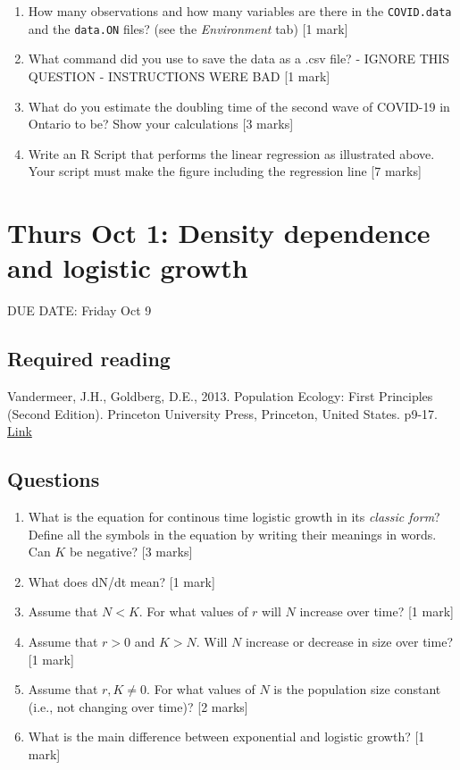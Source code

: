 \documentclass[]{book}
\begin{document}
\begin{enumerate}
\def\labelenumi{\arabic{enumi}.}
\item
  How many observations and how many variables are there in the
  \texttt{COVID.data} and the \texttt{data.ON} files? (see the
  \emph{Environment} tab) {[}1 mark{]}
\item
  What command did you use to save the data as a .csv file? - IGNORE
  THIS QUESTION - INSTRUCTIONS WERE BAD {[}1 mark{]}
\item
  What do you estimate the doubling time of the second wave of COVID-19
  in Ontario to be? Show your calculations {[}3 marks{]}
\item
  Write an R Script that performs the linear regression as illustrated
  above. Your script must make the figure including the regression line
  {[}7 marks{]}
\end{enumerate}

\chapter{Thurs Oct 1: Density dependence and logistic
growth}\label{thurs-oct-1-density-dependence-and-logistic-growth}

DUE DATE: Friday Oct 9

\section{Required reading}\label{required-reading}

Vandermeer, J.H., Goldberg, D.E., 2013. Population Ecology: First
Principles (Second Edition). Princeton University Press, Princeton,
United States. p9-17.
\href{https://ebookcentral-proquest-com.qe2a-proxy.mun.ca/lib/mun/detail.action?docID=1205619}{Link}

\section{Questions}\label{questions}

\begin{enumerate}
\def\labelenumi{\arabic{enumi}.}
\item
  What is the equation for continous time logistic growth in its
  \emph{classic form}? Define all the symbols in the equation by writing
  their meanings in words. Can \(K\) be negative? {[}3 marks{]}
\item
  What does dN/dt mean? {[}1 mark{]}
\item
  Assume that \(N < K\). For what values of \(r\) will \(N\) increase
  over time? {[}1 mark{]}
\item
  Assume that \(r > 0\) and \(K > N\). Will \(N\) increase or decrease
  in size over time? {[}1 mark{]}
\item
  Assume that \(r,K \neq 0\). For what values of \(N\) is the population
  size constant (i.e., not changing over time)? {[}2 marks{]}
\item
  What is the main difference between exponential and logistic growth?
  {[}1 mark{]}
\end{enumerate}
\end{document}
